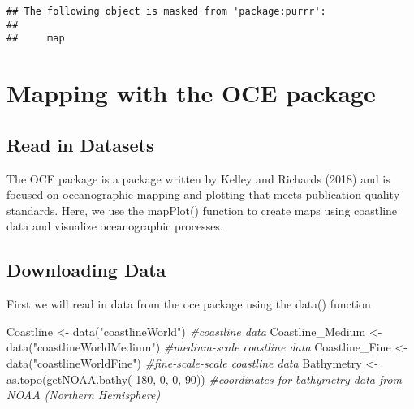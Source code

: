 \documentclass[]{tufte-handout}
\newenvironment{Shaded}{}{}
\newcommand{\CommentTok}[1]{\textcolor[rgb]{0.38,0.63,0.69}{\textit{#1}}}
\newcommand{\DecValTok}[1]{\textcolor[rgb]{0.25,0.63,0.44}{#1}}
\newcommand{\FunctionTok}[1]{\textcolor[rgb]{0.02,0.16,0.49}{#1}}
\newcommand{\NormalTok}[1]{#1}
\newcommand{\OtherTok}[1]{\textcolor[rgb]{0.00,0.44,0.13}{#1}}
\newcommand{\SpecialCharTok}[1]{\textcolor[rgb]{0.25,0.44,0.63}{#1}}
\newcommand{\StringTok}[1]{\textcolor[rgb]{0.25,0.44,0.63}{#1}}
\begin{document}
\begin{verbatim}
## The following object is masked from 'package:purrr':
## 
##     map
\end{verbatim}

\hypertarget{mapping-with-the-oce-package}{%
\section{Mapping with the OCE
package}\label{mapping-with-the-oce-package}}

\hypertarget{read-in-datasets}{%
\subsection{Read in Datasets}\label{read-in-datasets}}

The OCE package is a package written by Kelley and Richards (2018) and
is focused on oceanographic mapping and plotting that meets publication
quality standards. Here, we use the mapPlot() function to create maps
using coastline data and visualize oceanographic processes.

\hypertarget{downloading-data}{%
\subsection{Downloading Data}\label{downloading-data}}

First we will read in data from the oce package using the data()
function

\begin{Shaded}
\begin{Highlighting}[]
\NormalTok{Coastline }\OtherTok{\textless{}{-}} \FunctionTok{data}\NormalTok{(}\StringTok{"coastlineWorld"}\NormalTok{) }\CommentTok{\#coastline data}
\NormalTok{Coastline\_Medium }\OtherTok{\textless{}{-}} \FunctionTok{data}\NormalTok{(}\StringTok{"coastlineWorldMedium"}\NormalTok{) }\CommentTok{\#medium{-}scale coastline data}
\NormalTok{Coastline\_Fine }\OtherTok{\textless{}{-}} \FunctionTok{data}\NormalTok{(}\StringTok{"coastlineWorldFine"}\NormalTok{) }\CommentTok{\#fine{-}scale{-}scale coastline data}
\NormalTok{Bathymetry }\OtherTok{\textless{}{-}} \FunctionTok{as.topo}\NormalTok{(}\FunctionTok{getNOAA.bathy}\NormalTok{(}\SpecialCharTok{{-}}\DecValTok{180}\NormalTok{, }\DecValTok{0}\NormalTok{, }\DecValTok{0}\NormalTok{, }\DecValTok{90}\NormalTok{)) }\CommentTok{\#coordinates for bathymetry data from NOAA (Northern Hemisphere)}
\end{Highlighting}
\end{Shaded}
\end{document}
